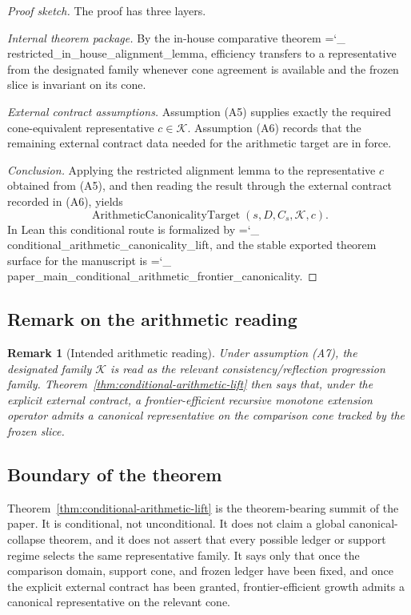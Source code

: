 \documentclass[11pt]{article}
\newtheorem{remark}{Remark}
\newcommand{\lid}[1]{{\small\ttfamily\hyphenchar\font=`\_ #1}}
\newcommand{\PaperMainTheorem}{\lid{paper\_main\_conditional\_arithmetic\_frontier\_canonicality}}
\begin{document}
\begin{proof}[Proof sketch]
The proof has three layers.

\emph{Internal theorem package.}
By the in-house comparative theorem \lid{restricted\_in\_house\_alignment\_lemma}, efficiency transfers to a representative from the designated family whenever cone agreement is available and the frozen slice is invariant on its cone.

\emph{External contract assumptions.}
Assumption \textup{(A5)} supplies exactly the required cone-equivalent representative \(c\in\mathcal{K}\). Assumption \textup{(A6)} records that the remaining external contract data needed for the arithmetic target are in force.

\emph{Conclusion.}
Applying the restricted alignment lemma to the representative \(c\) obtained from \textup{(A5)}, and then reading the result through the external contract recorded in \textup{(A6)}, yields
\[
\operatorname{ArithmeticCanonicalityTarget}(s,D,C_s,\mathcal{K},c).
\]
In Lean this conditional route is formalized by \lid{conditional\_arithmetic\_canonicality\_lift}, and the stable exported theorem surface for the manuscript is \PaperMainTheorem.
\end{proof}

\subsection*{Remark on the arithmetic reading}

\begin{remark}[Intended arithmetic reading]\label{rem:arithmetic-reading}
Under assumption \textup{(A7)}, the designated family \(\mathcal{K}\) is read as the relevant consistency/reflection progression family. Theorem~\ref{thm:conditional-arithmetic-lift} then says that, under the explicit external contract, a frontier-efficient recursive monotone extension operator admits a canonical representative on the comparison cone tracked by the frozen slice.
\end{remark}

\subsection*{Boundary of the theorem}

Theorem~\ref{thm:conditional-arithmetic-lift} is the theorem-bearing summit of the paper. It is conditional, not unconditional. It does not claim a global canonical-collapse theorem, and it does not assert that every possible ledger or support regime selects the same representative family. It says only that once the comparison domain, support cone, and frozen ledger have been fixed, and once the explicit external contract has been granted, frontier-efficient growth admits a canonical representative on the relevant cone.
\end{document}
